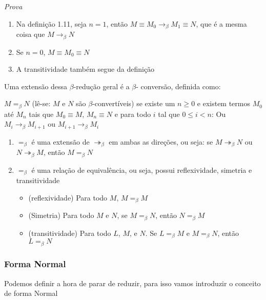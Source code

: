 \documentclass[../main.tex]{subfiles}
\begin{document}
\emph{Prova}
\begin{enumerate}
    \item Na definição 1.11, seja $n = 1$, então $M \equiv M_0 \to_{\beta} M_1 \equiv N$, que é a mesma coisa que $M \to_{\beta} N$
    \item Se $n = 0$, $M \equiv M_0 \equiv N$
    \item A transitividade também segue da definição
\end{enumerate}

Uma extensão dessa $\beta$-redução geral é a $\beta$- conversão, definida como:

\begin{definition}
    $M =_{\beta} N$ (lê-se: $M$  e $N$ são $\beta$-convertíveis) se existe um $n \geq 0$ e existem termos $M_0$ até $M_n$ tais que $M_0 \equiv M$, $M_n \equiv N$ e para todo $i$ tal que $0 \leq i < n$: Ou $M_i \to_{\beta} M_{i+1}$ ou $M_{i+1} \to_{\beta} M_i$
\end{definition}

\begin{lemma}
    \hfill
    \begin{enumerate}
        \item $=_{\beta}$ é uma extensão de $\twoheadrightarrow_{\beta}$ em ambas as direções, ou seja: se $M \twoheadrightarrow_{\beta} N$ ou $N \twoheadrightarrow_{\beta} M$, então $M =_{\beta} N$
        \item $=_{\beta}$ é uma relação de equivalência, ou seja, possui reflexividade, simetria e transitividade
        \begin{itemize}
            \item (reflexividade) Para todo $M$, $M =_{\beta} M$
            \item (Simetria) Para todo $M$ e $N$, se $M =_{\beta} N$, então $N =_{\beta} M$
            \item (transitividade) Para todo $L$, $M$, e $N$. Se $L =_{\beta} M$ e $M =_{\beta} N$, então $L =_{\beta} N$
        \end{itemize}
    \end{enumerate}
\end{lemma}

\subsubsection{Forma Normal}

Podemos definir a hora de parar de reduzir, para isso vamos introduzir o conceito de forma Normal
\end{document}
